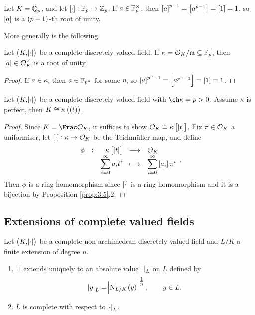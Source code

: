 \begin{example}
Let $ K = \mathbb{Q}_p $, and let $ \sbr{\cdot} : \FF_p \to \ZZ_p $. If $ a \in \mathbb{F}_p^\times $, then $ \sbr{a}^{p - 1} = \sbr{a^{p - 1}} = \sbr{1} = 1 $, so $ \sbr{a} $ is a $ \br{p - 1} $-th root of unity.
\end{example}

More generally is the following.

\begin{lemma}
Let $ \br{K, \abs{\cdot}} $ be a complete discretely valued field. If $ \kappa = \mathcal{O}_K / \mathfrak{m} \subseteq \overline{\mathbb{F}_p} $, then $ \sbr{a} \in \OOO_K^\times $ is a root of unity.
\end{lemma}

\begin{proof}
If $ a \in \kappa $, then $ a \in \mathbb{F}_{p^n} $ for some $ n $, so $ \sbr{a}^{p^n - 1} = \sbr{a^{p^n - 1}} = \sbr{1} = 1 $.
\end{proof}

\begin{theorem}
\label{thm:5.7}
Let $ \br{K, \abs{\cdot}} $ be a complete discretely valued field with $ \ch \kappa = p > 0 $. Assume $ \kappa $ is perfect, then $ K \cong \kappa\br{\br{t}} $.
\end{theorem}

\begin{proof}
Since $ K = \Frac \OOO_K $, it suffices to show $ \OOO_K \cong \kappa\sbr{\sbr{t}} $. Fix $ \pi \in \mathcal{O}_K $ a uniformiser, let $ \sbr{\cdot} : \kappa \to \OOO_K $ be the Teichm\"uller map, and define
$$ \function[\phi]{\kappa\sbr{\sbr{t}}}{\OOO_K}{\sum_{i = 0}^\infty a_it^i}{\sum_{i = 0}^\infty \sbr{a_i}\pi^i}. $$
Then $ \phi $ is a ring homomorphism since $ \sbr{\cdot} $ is a ring homomorphism and it is a bijection by Proposition \ref{prop:3.5}.$ 2 $.
\end{proof}

\subsection{Extensions of complete valued fields}


\begin{theorem}
\label{thm:6.1}
Let $ \br{K, \abs{\cdot}} $ be a complete non-archimedean discretely valued field and $ L / K $ a finite extension of degree $ n $.
\begin{enumerate}
\item $ \abs{\cdot} $ extends uniquely to an absolute value $ \abs{\cdot}_L $ on $ L $ defined by
$$ \abs{y}_L = \abs{\N_{L / K}\br{y}}^{\tfrac{1}{n}}, \qquad y \in L. $$
\item $ L $ is complete with respect to $ \abs{\cdot}_L $.
\end{enumerate}
\end{theorem}

